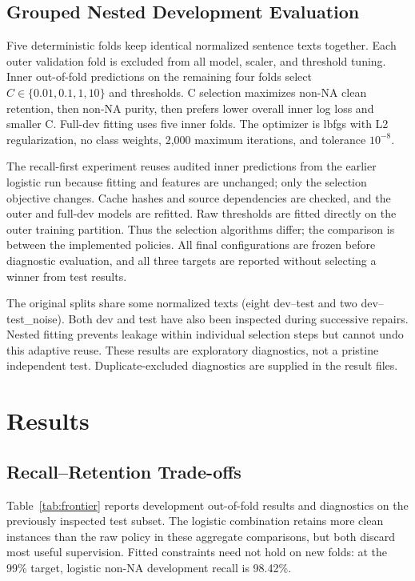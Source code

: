 \documentclass[11pt]{article}
\begin{document}
\subsection{Grouped Nested Development Evaluation}
Five deterministic folds keep identical normalized sentence texts together. Each outer validation fold is excluded from all model, scaler, and threshold tuning. Inner out-of-fold predictions on the remaining four folds select $C\in\{0.01,0.1,1,10\}$ and thresholds. C selection maximizes non-NA clean retention, then non-NA purity, then prefers lower overall inner log loss and smaller C. Full-dev fitting uses five inner folds. The optimizer is lbfgs with L2 regularization, no class weights, 2,000 maximum iterations, and tolerance $10^{-8}$.

The recall-first experiment reuses audited inner predictions from the earlier logistic run because fitting and features are unchanged; only the selection objective changes. Cache hashes and source dependencies are checked, and the outer and full-dev models are refitted. Raw thresholds are fitted directly on the outer training partition. Thus the selection algorithms differ; the comparison is between the implemented policies. All final configurations are frozen before diagnostic evaluation, and all three targets are reported without selecting a winner from test results.

The original splits share some normalized texts (eight dev--test and two dev--test\_noise). Both dev and test have also been inspected during successive repairs. Nested fitting prevents leakage within individual selection steps but cannot undo this adaptive reuse. These results are exploratory diagnostics, not a pristine independent test. Duplicate-excluded diagnostics are supplied in the result files.

\section{Results}
\subsection{Recall--Retention Trade-offs}
Table~\ref{tab:frontier} reports development out-of-fold results and diagnostics on the previously inspected test subset. The logistic combination retains more clean instances than the raw policy in these aggregate comparisons, but both discard most useful supervision. Fitted constraints need not hold on new folds: at the 99\% target, logistic non-NA development recall is 98.42\%.
\end{document}
